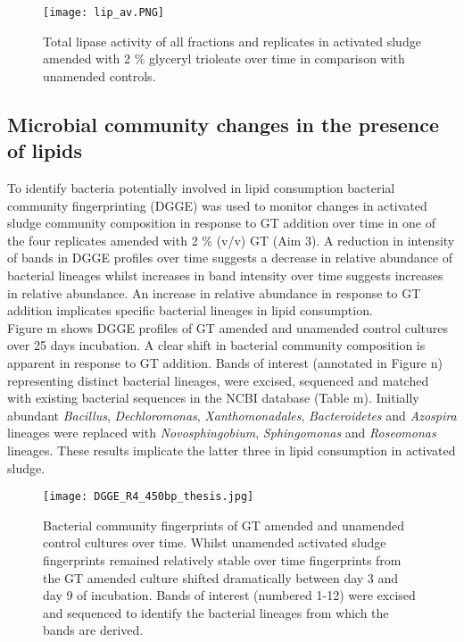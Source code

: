 \documentclass[twoside]{article}
\begin{document}
\begin{figure}
\texttt{[image: lip\_av.PNG]}
\caption{Total lipase activity of all fractions and replicates in activated sludge amended with 2 \% glyceryl trioleate over time in comparison with unamended controls.}
\end{figure}
\FloatBarrier

\subsection{Microbial community changes in the presence of lipids}
To identify bacteria potentially involved in lipid consumption bacterial community fingerprinting (DGGE) was used to monitor changes in activated sludge community composition in response to GT addition over time in one of the four replicates amended with 2 \% (v/v) GT (Aim 3). A reduction in intensity of bands in DGGE profiles over time suggests a decrease in relative abundance of bacterial lineages whilst increases in band intensity over time suggests increases in relative abundance. An increase in relative abundance in response to GT addition implicates specific bacterial lineages in lipid consumption.\\

Figure m shows DGGE profiles of GT amended and unamended control cultures over 25 days incubation. A clear shift in bacterial community composition is apparent in response to GT addition. Bands of interest (annotated in Figure n) representing distinct bacterial lineages, were excised, sequenced and matched with existing bacterial sequences in the NCBI database (Table m). Initially abundant \emph{Bacillus}, \emph{Dechloromonas}, \emph{Xanthomonadales}, \emph{Bacteroidetes} and \emph{Azospira} lineages were replaced with \emph{Novosphingobium}, \emph{Sphingomonas} and \emph{Roseomonas} lineages. These results implicate the latter three in lipid consumption in activated sludge.\\

\begin{figure}
\texttt{[image: DGGE\_R4\_450bp\_thesis.jpg]}
\caption{Bacterial community fingerprints of GT amended and unamended control cultures over time. Whilst unamended activated sludge fingerprints remained relatively stable over time fingerprints from the GT amended culture shifted dramatically between day 3 and day 9 of incubation. Bands of interest (numbered 1-12) were excised and sequenced to identify the bacterial lineages from which the bands are derived.}
\end{figure}
\end{document}
